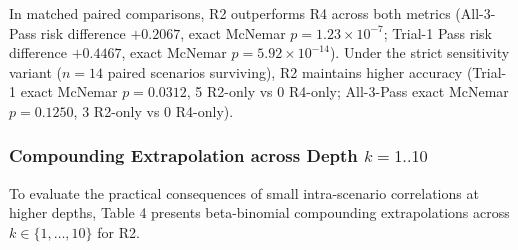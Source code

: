 \documentclass[11pt,letterpaper]{article}
\begin{document}
In matched paired comparisons, R2 outperforms R4 across both metrics (All-3-Pass risk difference $+0.2067$, exact McNemar $p = 1.23 \times 10^{-7}$; Trial-1 Pass risk difference $+0.4467$, exact McNemar $p = 5.92 \times 10^{-14}$). Under the strict sensitivity variant ($n=14$ paired scenarios surviving), R2 maintains higher accuracy (Trial-1 exact McNemar $p = 0.0312$, 5 R2-only vs 0 R4-only; All-3-Pass exact McNemar $p = 0.1250$, 3 R2-only vs 0 R4-only).

\subsubsection*{Compounding Extrapolation across Depth $k=1..10$}
To evaluate the practical consequences of small intra-scenario correlations at higher depths, Table 4 presents beta-binomial compounding extrapolations across $k \in \{1, \dots, 10\}$ for R2.


\begin{table}[htbp]
\centering
\small
\setlength{\tabcolsep}{4.5pt}
\caption{Table 4: Beta-binomial compounding extrapolation across repetition depths $k \in \{1, \dots, 10\}$ for R2 ($\text{pass@1} = 0.6311$). While $C_3 \approx 1.10$ at $k=3$ (a 1.4 pp gap), divergence amplifies to $C_8 \approx 2.25$ by $k=8$ ($\text{pass}^8 \approx 0.057$ vs naive $0.025$).}
\end{table}
\end{document}
